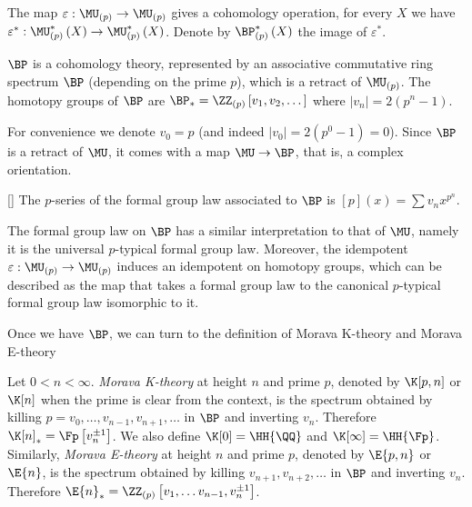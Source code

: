 The map $\varepsilon: \MU_{\left(p\right)} \to \MU_{\left(p\right)}$ gives a cohomology operation, for every $X$ we have $\varepsilon^*: \MU_{\left(p\right)}^*\left(X\right) \to \MU_{\left(p\right)}^*\left(X\right)$.
Denote by $\BP_{\left(p\right)}^*\left(X\right)$ the image of $\varepsilon^*$.

\begin{theorem}
	$\BP$ is a cohomology theory, represented by an associative commutative ring spectrum $\BP$ (depending on the prime $p$), which is a retract of $\MU_{\left(p\right)}$.
	The homotopy groups of $\BP$ are $\BP_* = \ZZ_{\left(p\right)}\left[v_1, v_2, \dotsc\right]$ where $\left|v_n\right| = 2\left(p^n-1\right)$.
\end{theorem}

For convenience we denote $v_0 = p$ (and indeed $\left|v_0\right| = 2\left(p^0-1\right) = 0$).
Since $\BP$ is a retract of $\MU$, it comes with a map $\MU \to \BP$, that is, a complex orientation.

\begin{proposition}\label{bp-p-series}[]
	The $p$-series of the formal group law associated to $\BP$ is
	$\left[p\right]\left(x\right) = \sum v_n x^{p^n}$.
\end{proposition}

\begin{remark}
	The formal group law on $\BP$ has a similar interpretation to that of $\MU$, namely it is the universal $p$-typical formal group law.
	Moreover, the idempotent $\varepsilon: \MU_{\left(p\right)} \to \MU_{\left(p\right)}$ induces an idempotent on homotopy groups, which can be described as the map that takes a formal group law to the canonical $p$-typical formal group law isomorphic to it.
\end{remark}

Once we have $\BP$, we can turn to the definition of Morava K-theory and Morava E-theory

\begin{definition}
	Let $0 < n < \infty$.
	\emph{Morava K-theory} at height $n$ and prime $p$, denoted by $\K[p,n]$ or $\K[n]$ when the prime is clear from the context, is the spectrum obtained by killing $p=v_0, \dotsc, v_{n-1}, v_{n+1}, \dotsc$ in $\BP$ and inverting $v_n$.
	Therefore $\K[n]_* = \Fp\left[v_n^{\pm 1}\right]$.
	We also define $\K[0] = \HH{\QQ}$ and $\K[\infty] = \HH{\Fp}$.
	Similarly, \emph{Morava E-theory} at height $n$ and prime $p$, denoted by $\E{p,n}$ or $\E{n}$, is the spectrum obtained by killing $v_{n+1}, v_{n+2}, \dotsc$ in $\BP$ and inverting $v_n$.
	Therefore $\E{n}_* = \ZZ_{\left(p\right)}\left[v_1, \dotsc v_{n-1}, v_n^{\pm 1}\right]$.
\end{definition}

